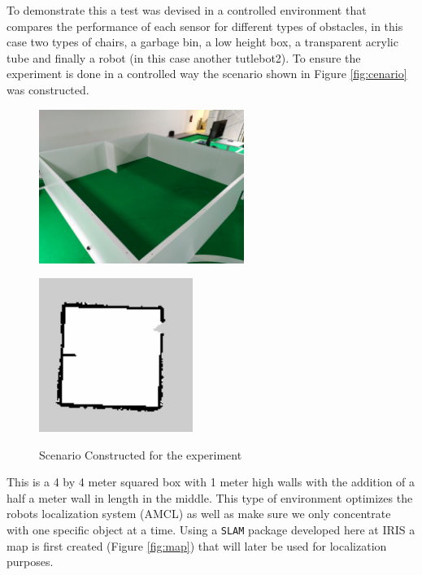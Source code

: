 To demonstrate this a test was devised in a controlled environment that compares the performance of each sensor for different types of obstacles, in this case two types of chairs, a garbage bin, a low height box, a transparent acrylic tube and finally a robot (in this case another tutlebot2).  
To ensure the experiment is done in a controlled way the scenario shown in Figure \ref{fig:cenario} was constructed. 
\begin{figure}[ht!] 
    \begin{minipage}[t]{.49\linewidth}
        \includegraphics[height=5cm,width=\linewidth]{imgs/chapter5/mapP.jpg}
        \label{fig:cenario}
    \end{minipage}
    \begin{minipage}[t]{.49\linewidth}
        \includegraphics[height=5cm,width=\linewidth]{imgs/chapter5/map.png}
        \label{fig:map}
    \end{minipage}
    \caption{Scenario Constructed for the experiment}
    \label{fig:setup2}
\end{figure}
This is a 4 by 4 meter squared box with 1 meter high walls with the addition of a half a meter wall in length in the middle. This type of environment optimizes the robots localization system (\ac{AMCL}) as well as make sure we only concentrate with one specific object at a time. Using a \texttt{\ac{SLAM}} package developed here at \ac{IRIS} a map is first created (Figure \ref{fig:map}) that will later be used for localization purposes.

